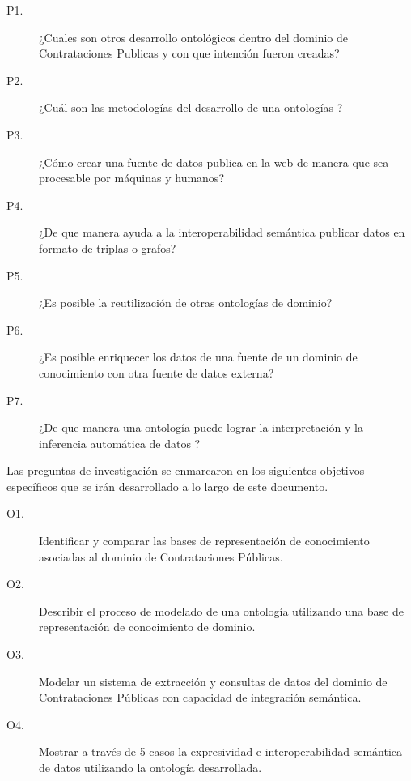 \begin{description}
    \item[P1.] ¿Cuales son otros desarrollo ontológicos dentro del dominio de Contrataciones Publicas y con que intención fueron creadas? 
    \item[P2.] ¿Cuál son las metodologías del desarrollo de una ontologías ?
    \item[P3.] ¿Cómo crear una fuente de datos publica en la web de manera que sea procesable por máquinas y humanos?
    \item[P4.] ¿De que manera ayuda a la interoperabilidad semántica publicar datos en formato de triplas o grafos?
    \item[P5.] ¿Es posible la reutilización de otras ontologías de dominio?
    \item[P6.] ¿Es posible enriquecer los datos  de una fuente de un dominio de conocimiento con otra fuente de datos externa?
    \item[P7.] ¿De que manera una ontología puede lograr la interpretación y la inferencia automática de datos ?
    
\end{description} 

Las preguntas de investigación se enmarcaron en los siguientes objetivos específicos que se irán desarrollado a lo largo de este documento.

\begin{description}
    \item[O1.] Identificar y comparar las bases de representación de conocimiento asociadas al dominio de Contrataciones Públicas.
    \item[O2.] Describir el proceso de modelado de una ontología utilizando una base de representación de conocimiento de dominio.
    \item[O3.] Modelar un sistema de extracción y consultas de datos del dominio de Contrataciones Públicas con capacidad de integración semántica.
    \item[O4.] Mostrar a través de 5 casos la expresividad e interoperabilidad semántica de datos utilizando la ontología desarrollada.
\end{description} 


